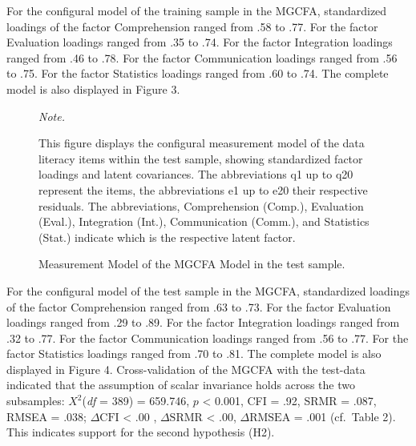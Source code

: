 \documentclass[
  12pt,
  a4paper,
  twoside]{article}
\begin{document}
For the configural model of the training sample in the MGCFA, standardized loadings of the factor Comprehension ranged from .58 to .77. For the factor Evaluation loadings ranged from .35 to .74. For the factor Integration loadings ranged from .46 to .78. For the factor Communication loadings ranged from .56 to .75. For the factor Statistics loadings ranged from .60 to .74. The complete model is also displayed in Figure 3.

\vspace{0.3cm}
\begin{figure}
    \centering
    \caption{Measurement Model of the MGCFA Model in the test sample.} 
    \small
    \textit{Note.} \raggedright This figure displays the configural measurement model of the data literacy items within the test sample, showing standardized factor loadings and latent covariances. The abbreviations q1 up to q20 represent the items, the abbreviations e1 up to e20 their respective residuals. The abbreviations, Comprehension (Comp.), Evaluation (Eval.), Integration (Int.), Communication (Comm.), and Statistics (Stat.) indicate which is the respective latent factor.
\end{figure}
\vspace{0.3cm}

For the configural model of the test sample in the MGCFA, standardized loadings of the factor Comprehension ranged from .63 to .73. For the factor Evaluation loadings ranged from .29 to .89. For the factor Integration loadings ranged from .32 to .77. For the factor Communication loadings ranged from .56 to .77. For the factor Statistics loadings ranged from .70 to .81. The complete model is also displayed in Figure 4.
Cross-validation of the MGCFA with the test-data indicated that the assumption of scalar invariance holds across the two subsamples: \(X^{2}\)(\emph{df} = 389) = 659.746, \(p\) \textless{} 0.001, CFI = .92, SRMR = .087, RMSEA = .038; \(\Delta\text{CFI}\) \textless{} .00 , \(\Delta\text{SRMR}\) \textless{} .00, \(\Delta\text{RMSEA}\) = .001 (cf.~Table 2). This indicates support for the second hypothesis (H2).
\end{document}
